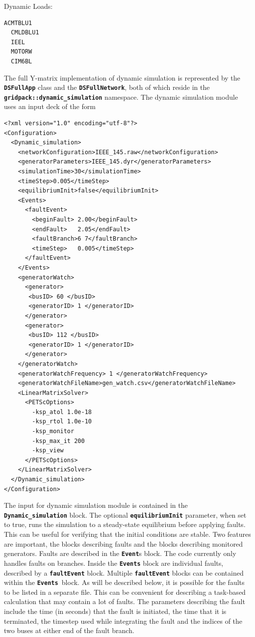 Dynamic Loads:

{
\color{red}
\begin{Verbatim}[fontseries=b]
  ACMTBLU1
  CMLDBLU1
  IEEL
  MOTORW
  CIM6BL
\end{Verbatim}
}

The full Y-matrix implementation of dynamic simulation is represented by the \texttt{\textbf{DSFullApp}} class and the \texttt{\textbf{DSFullNetwork}}, both of which reside in the \texttt{\textbf{gridpack::dynamic\_simulation}} namespace.
The dynamic simulation module uses an input deck of the form
{
\color{blue}
\begin{Verbatim}[fontseries=b]
<?xml version="1.0" encoding="utf-8"?>
<Configuration>
  <Dynamic_simulation>
    <networkConfiguration>IEEE_145.raw</networkConfiguration>
    <generatorParameters>IEEE_145.dyr</generatorParameters>
    <simulationTime>30</simulationTime>
    <timeStep>0.005</timeStep>
    <equilibriumInit>false</equilibriumInit>
    <Events>
      <faultEvent>
        <beginFault> 2.00</beginFault>
        <endFault>   2.05</endFault>
        <faultBranch>6 7</faultBranch>
        <timeStep>   0.005</timeStep>
      </faultEvent>
    </Events>
    <generatorWatch>
      <generator>
       <busID> 60 </busID>
       <generatorID> 1 </generatorID>
      </generator>
      <generator>
       <busID> 112 </busID>
       <generatorID> 1 </generatorID>
      </generator>
    </generatorWatch>
    <generatorWatchFrequency> 1 </generatorWatchFrequency>
    <generatorWatchFileName>gen_watch.csv</generatorWatchFileName>
    <LinearMatrixSolver>
      <PETScOptions>
        -ksp_atol 1.0e-18
        -ksp_rtol 1.0e-10
        -ksp_monitor
        -ksp_max_it 200
        -ksp_view
      </PETScOptions>
    </LinearMatrixSolver>
  </Dynamic_simulation>
</Configuration>
\end{Verbatim}
}

The input for dynamic simulation module is contained in the \texttt{\textbf{Dynamic\_simulation}} block. The optional \texttt{\textbf{equilibriumInit}} parameter, when set to true, runs the simulation to a steady-state equilibrium before applying faults. This can be useful for verifying that the initial conditions are stable. Two features are important, the blocks describing faults and the blocks describing monitored generators. Faults are described in the \texttt{\textbf{Event}}s block. The code currently only handles faults on branches. Inside the \texttt{\textbf{Events}} block are individual faults, described by a \texttt{\textbf{faultEvent}} block. Multiple \texttt{\textbf{faultEvent}} blocks can be contained within the \texttt{\textbf{Events }}block. As will be described below, it is possible for the faults to be listed in a separate file. This can be convenient for describing a task-based calculation that may contain a lot of faults. The parameters describing the fault include the time (in seconds) that the fault is initiated, the time that it is terminated, the timestep used while integrating the fault and the indices of the two buses at either end of the fault branch.

